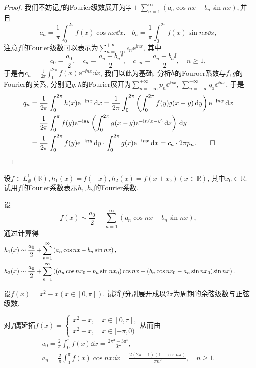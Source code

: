 \begin{quiza}
\begin{proof}
我们不妨记\(f\)的Fourier级数展开为\(\frac{a_0}{2}+\sum_{n=1}^{\infty}\left(a_n\cos nx+b_n\sin nx\right),\)并且\[a_n=\frac{1}{\pi}\int_{0}^{2\pi}f(x)\cos nx\dd x.\quad b_n=\frac{1}{\pi}\int_{0}^{2\pi}f(x)\sin nx\dd x,\]注意\(f\)的Fourier级数可以表示为\(\sum_{n=-\infty}^{+\infty}c_n\ee^{\ii nx}\), 其中\[c_0=\frac{a_0}{2},\quad c_n=\frac{a_n-b_n\ii}{2},\quad c_{-n}=\frac{a_n+b_n\ii}{2},\quad n\geqslant 1,\]于是有\(c_n=\frac{1}{2\pi}\int_{0}^{2\pi}f(x)\ee^{-\ii nx}\dd x\), 我们以此为基础, 分析\(h\)的Fouroer系数与\(f,g\)的Fourier的关系, 分别记\(g,h\)的Fourier展开为\(\sum_{n=-\infty}^{+\infty}p_n\ee^{\ii nx},\,\sum_{n=-\infty}^{+\infty}q_n\ee^{\ii nx}\), 于是\[\begin{split}
q_n&=\frac{1}{2\pi}\int_{0}^{2\pi}h(x)\mathrm{e}^{-\mathrm{i} nx}\,\mathrm{d} x=\frac{1}{2\pi}\int_{0}^{2\pi}\left(\int_{0}^{2\pi}f(y)g(x-y)\,\mathrm{d} y\right)\mathrm{e}^{-\mathrm{i} nx}\,\mathrm{d} x\\&=\frac{1}{2\pi}\int_{0}^{\pi}f(y)\mathrm{e}^{-\mathrm{i} ny}\left(\int_{0}^{2\pi}g(x-y)\mathrm{e}^{-\mathrm{i} n(x-y)}\,\mathrm{d} x\right)\,\mathrm{d} y\\&=\frac{1}{2\pi}\int_{0}^{2\pi}f(y)\mathrm{e}^{-\mathrm{i} ny}\,\mathrm{d} y\cdot\int_{0}^{2\pi}g(x)\mathrm{e}^{-\mathrm{i} nx}\,\mathrm{d} x=c_n\cdot 2\pi p_n.\qedhere
\end{split}\]
\end{proof}
\woe 设\(f\in L_{\#}^1\left(\mathbb{R}\right),h_1(x)=f(-x),h_2(x)=f(x+x_0)\left(x\in\mathbb{R}\right)\), 其中\(x_0\in\mathbb{R}\). 试用\(f\)的Fourier系数表示\(h_1,h_2\)的Fourier系数.
\begin{solution}
设\[f(x)\sim\frac{a_0}{2}+\sum_{n=1}^{\infty}\left(a_n\cos nx+b_n\sin nx\right),\]通过计算得\[\begin{split}
h_1(x)&\sim\frac{a_0}{2}+\sum_{n=1}^{\infty}\left(a_n\cos nx-b_n\sin nx\right),\\
h_2(x)&\sim\frac{a_0}{2}+\sum_{n=1}^{\infty}\left(\left(a_n\cos nx_0+b_n\sin nx_0\right)\cos nx+\left(b_n\cos nx_0-a_n\sin nx_0\right)\sin nx\right).\qedhere
\end{split}\]
\end{solution}
\woe 设\(f(x)=x^2-x\left(x\in\left[0,\pi\right]\right)\). 试将\(f\)分别展开成以\(2\pi\)为周期的余弦级数与正弦级数.
\begin{solution}
对\(f\)偶延拓\(f(x)=\begin{cases}
x^2-x,\quad x\in[0,\pi],\\
x^2+x,\quad x\in[-\pi,0)
\end{cases}\)从而由
\begin{gather*}
a_0=\frac{2}{\pi}\int_{0}^{\pi}f(x)\dd x=\frac{2\pi^3-3\pi^2}{3\pi},\\a_n=\frac{2}{\pi}\int_{0}^{\pi}f(x)\cos nx\dd x=\frac{2(2\pi-1)(1+\cos n\pi)}{\pi n^2},\quad n\geqslant 1.

\end{gather*}
\end{solution}
\end{quiza}
